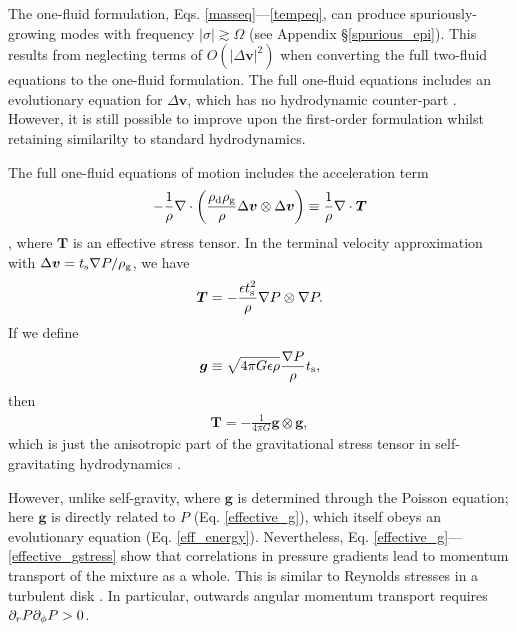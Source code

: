 The one-fluid formulation, 
Eqs. \ref{masseq}---\ref{tempeq}, can 
produce spuriously-growing modes with frequency $|\sigma|\gtrsim
\Omega$ (see Appendix \S\ref{spurious_epi}). This 
results from neglecting terms of $O(|\Delta\bm{v}|^2)$ when converting
the full two-fluid equations to the one-fluid formulation. The full
one-fluid equations 
 includes an evolutionary equation for $\Delta\bm{v}$, which has no
 hydrodynamic counter-part \citep{laibe14}. However, it is
 still possible to improve upon 
 the first-order formulation whilst retaining similarilty to  
 standard hydrodynamics.  

The full one-fluid equations of motion includes the acceleration term 
\begin{align}
-\frac{1}{\rho}\nabla\cdot\left(\frac{\rho_\mathrm{d}\rho_\mathrm{g}}{\rho}\Delta\bm{v}\otimes\Delta\bm{v}\right) 
\equiv  \frac{1}{\rho}\nabla\cdot \bm{T} 
\end{align}
\citep{youdin05a}, 
where $\bm{T}$ is an effective stress tensor. 
In the terminal velocity
approximation with $\Delta\bm{v} = t_\mathrm{s} 
\nabla P/\rho_\mathrm{g}$, we have 
\begin{align}
\bm{T} = - \frac{\epsilon t_\mathrm{s}^2}{\rho}\nabla P \otimes \nabla P.
\end{align}
If we define 
\begin{align}
  \bm{g} \equiv \sqrt{4\pi G \epsilon \rho} \frac{\nabla P}{\rho}
  t_\mathrm{s},\label{effective_g} 
\end{align}
then
\begin{align}
\bm{T} = - \frac{1}{4\pi G} \bm{g}\otimes\bm{g}, \label{effective_gstress}
\end{align}
which is just the anisotropic part of the  
gravitational stress tensor in self-gravitating hydrodynamics 
\citep{lynden-bell72}.

 However, unlike self-gravity, where $\bm{g}$ is
determined through the Poisson equation; here $\bm{g}$ is directly
related to $P$ (Eq. \ref{effective_g}), which itself obeys an 
evolutionary equation (Eq. \ref{eff_energy}). 
Nevertheless, Eq. \ref{effective_g}---\ref{effective_gstress}
show that correlations in  pressure gradients lead to 
momentum transport of the mixture as a whole. This is similar to Reynolds stresses in
a turbulent disk \citep{balbus99}. In particular, 
outwards angular momentum transport requires $\partial_rP\partial_\phi P > 0$.    

